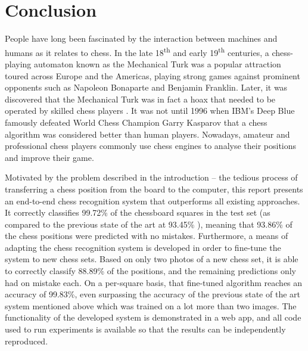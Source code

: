 \documentclass[../main.tex]{subfiles}
\begin{document}
\chapter{Conclusion}
\label{chap:conclusion}

People have long been fascinated by the interaction between machines and humans as it relates to chess.
In the late 18\textsuperscript{th} and early 19\textsuperscript{th} centuries, a chess-playing automaton known as the Mechanical Turk was a popular attraction toured across Europe and the Americas, playing strong games against prominent opponents such as Napoleon Bonaparte and Benjamin Franklin.
Later, it was discovered that the Mechanical Turk was in fact a hoax that needed to be operated by skilled chess players \cite{standage2003}.
It was not until 1996 when IBM's Deep Blue famously defeated World Chess Champion Garry Kasparov that a chess algorithm was considered better than human players.
Nowadays, amateur and professional chess players commonly use chess engines to analyse their positions and improve their game.

Motivated by the problem described in the introduction -- the tedious process of transferring a chess position from the board to the computer, this report presents an end-to-end chess recognition system that outperforms all existing approaches.
It correctly classifies 99.72\% of the chessboard squares in the test set (as compared to the previous state of the art at 93.45\% \cite{mehta2020}), meaning that 93.86\% of the chess positions were predicted with no mistakes. 
Furthermore, a means of adapting the chess recognition system is developed in order to fine-tune the system to new chess sets.
Based on only two photos of a new chess set, it is able to correctly classify 88.89\% of the positions, and the remaining predictions only had on mistake each.
On a per-square basis, that fine-tuned algorithm reaches an accuracy of 99.83\%, even surpassing the accuracy of the previous state of the art system mentioned above which was trained on a lot more than two images.
The functionality of the developed system is demonstrated in a web app, and all code used to run experiments is available so that the results can be independently reproduced.
\end{document}
